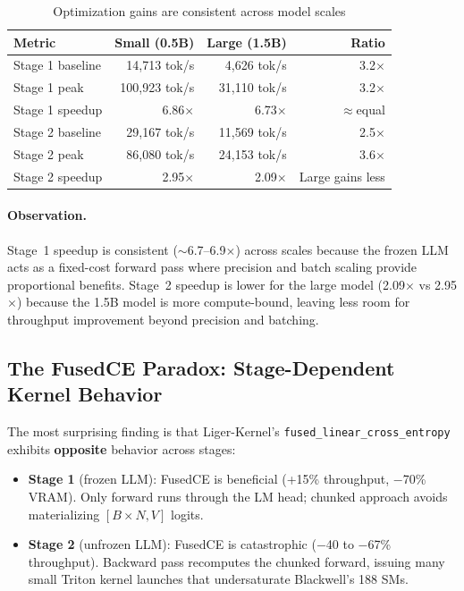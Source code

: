 \documentclass[11pt,a4paper]{article}
\begin{document}
\begin{table}[H]
\centering
\caption{Optimization gains are consistent across model scales}
\label{tab:crossscale}
\begin{tabular}{@{}lrrr@{}}
\toprule
Metric & Small (0.5B) & Large (1.5B) & Ratio \\
\midrule
Stage 1 baseline & 14,713 tok/s & 4,626 tok/s & 3.2$\times$ \\
Stage 1 peak & 100,923 tok/s & 31,110 tok/s & 3.2$\times$ \\
Stage 1 speedup & 6.86$\times$ & 6.73$\times$ & $\approx$equal \\
\midrule
Stage 2 baseline & 29,167 tok/s & 11,569 tok/s & 2.5$\times$ \\
Stage 2 peak & 86,080 tok/s & 24,153 tok/s & 3.6$\times$ \\
Stage 2 speedup & 2.95$\times$ & 2.09$\times$ & Large gains less \\
\bottomrule
\end{tabular}
\end{table}

\paragraph{Observation.} Stage~1 speedup is consistent ($\sim$6.7--6.9$\times$) across
scales because the frozen LLM acts as a fixed-cost forward pass where precision and batch
scaling provide proportional benefits. Stage~2 speedup is lower for the large model
(2.09$\times$ vs 2.95$\times$) because the 1.5B model is more compute-bound, leaving
less room for throughput improvement beyond precision and batching.

\subsection{The FusedCE Paradox: Stage-Dependent Kernel Behavior}
\label{sec:fusedce}

The most surprising finding is that Liger-Kernel's \texttt{fused\_linear\_cross\_entropy}
exhibits \textbf{opposite} behavior across stages:

\begin{itemize}[leftmargin=*,nosep]
  \item \textbf{Stage 1} (frozen LLM): FusedCE is beneficial (+15\% throughput, $-$70\% VRAM).
    Only forward runs through the LM head; chunked approach avoids materializing
    $[B {\times} N, V]$ logits.
  \item \textbf{Stage 2} (unfrozen LLM): FusedCE is catastrophic ($-$40 to $-$67\% throughput).
    Backward pass recomputes the chunked forward, issuing many small Triton kernel launches
    that undersaturate Blackwell's 188 SMs.
\end{itemize}
\end{document}
